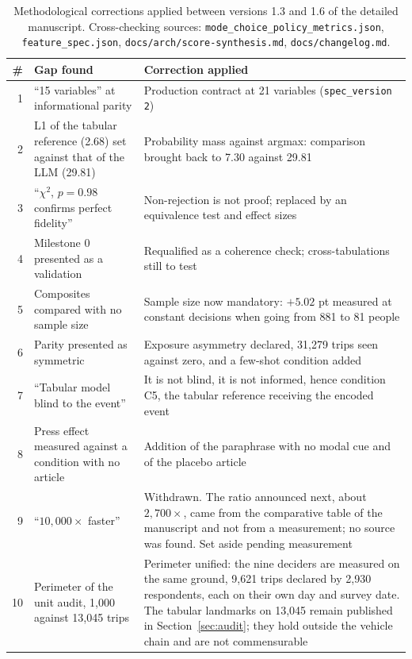 \begin{table}[tp]
  \caption{Methodological corrections applied between versions 1.3 and 1.6 of the detailed manuscript. Cross-checking sources: \texttt{mode\_choice\_policy\_metrics.json}, \texttt{feature\_spec.json}, \texttt{docs/arch/score-synthesis.md}, \texttt{docs/changelog.md}.}
  \label{tab:corrections}
  \begin{tabular}{rp{}p{}}
    \toprule
    \# & Gap found & Correction applied \\
    \midrule
    1 & ``15 variables'' at informational parity & Production contract at 21 variables (\texttt{spec\_version 2}) \\
    2 & L1 of the tabular reference (2.68) set against that of the LLM (29.81) & Probability mass against argmax: comparison brought back to 7.30 against 29.81 \\
    3 & ``$\chi^2$, $p = 0.98$ confirms perfect fidelity'' & Non-rejection is not proof; replaced by an equivalence test and effect sizes \\
    4 & Milestone 0 presented as a validation & Requalified as a coherence check; cross-tabulations still to test \\
    5 & Composites compared with no sample size & Sample size now mandatory: $+5.02$ pt measured at constant decisions when going from 881 to 81 people \\
    6 & Parity presented as symmetric & Exposure asymmetry declared, 31{,}279 trips seen against zero, and a few-shot condition added \\
    7 & ``Tabular model blind to the event'' & It is not blind, it is not informed, hence condition C5, the tabular reference receiving the encoded event \\
    8 & Press effect measured against a condition with no article & Addition of the paraphrase with no modal cue and of the placebo article \\
    9 & ``$10{,}000\times$ faster'' & Withdrawn. The ratio announced next, about $2{,}700\times$, came from the comparative table of the manuscript and not from a measurement; no source was found. Set aside pending measurement \\
    10 & Perimeter of the unit audit, 1{,}000 against 13{,}045 trips & Perimeter unified: the nine deciders are measured on the same ground, 9{,}621 trips declared by 2{,}930 respondents, each on their own day and survey date. The tabular landmarks on 13{,}045 remain published in Section~\ref{sec:audit}; they hold outside the vehicle chain and are not commensurable \\

\end{tabular}
\end{table}
